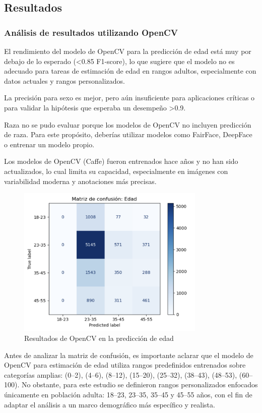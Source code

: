 \newpage
\subsection{Resultados}
\subsubsection{Análisis de resultados utilizando OpenCV}
El rendimiento del modelo de OpenCV para la predicción de edad está muy por debajo de lo esperado (<0.85 F1-score), lo que sugiere que el modelo no es adecuado para tareas de estimación de edad en rangos adultos, especialmente con datos actuales y rangos personalizados.

La precisión para sexo es mejor, pero aún insuficiente para aplicaciones críticas o para validar la hipótesis que esperaba un desempeño >0.9.

Raza no se pudo evaluar porque los modelos de OpenCV no incluyen predicción de raza. Para este propósito, deberías utilizar modelos como FairFace, DeepFace o entrenar un modelo propio.

Los modelos de OpenCV (Caffe) fueron entrenados hace años y no han sido actualizados, lo cual limita su capacidad, especialmente en imágenes con variabilidad moderna y anotaciones más precisas.

\begin{figure}[h]
  \centering
  \includegraphics[width=0.8\textwidth]{assets/MatrizConfusionEdad-opencv.png}
  \caption{Resultados de OpenCV en la predicción de edad}
  \label{fig:opencv_results}
\end{figure}
Antes de analizar la matriz de confusión, es importante aclarar que el modelo de OpenCV para estimación de edad utiliza rangos predefinidos entrenados sobre categorías amplias: (0–2), (4–6), (8–12), (15–20), (25–32), (38–43), (48–53), (60–100).  No obstante, para este estudio se definieron rangos personalizados enfocados únicamente en población adulta: 18–23, 23–35, 35–45 y 45–55 años, con el fin de adaptar el análisis a un marco demográfico más específico y realista.

